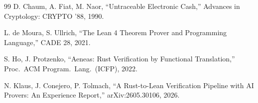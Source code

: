 \documentclass[twocolumn,10pt]{article}
\begin{document}
\begin{thebibliography}{99}
 D. Chaum, A. Fiat, M. Naor, ``Untraceable Electronic Cash,'' Advances in Cryptology: CRYPTO '88, 1990.

 L. de Moura, S. Ullrich, ``The Lean 4 Theorem Prover and Programming Language,'' CADE 28, 2021.

 S. Ho, J. Protzenko, ``Aeneas: Rust Verification by Functional Translation,'' Proc.\ ACM Program.\ Lang.\ (ICFP), 2022.

 N. Klaus, J. Conejero, P. Tolmach, ``A Rust-to-Lean Verification Pipeline with AI Provers: An Experience Report,'' arXiv:2605.30106, 2026.

\end{thebibliography}
\end{document}

